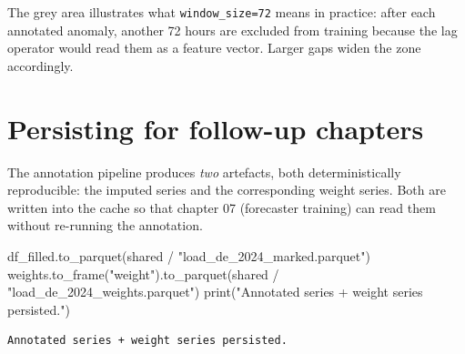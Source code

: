 \documentclass[
  english,
  letterpaper,
]{scrbook}
\newenvironment{Shaded}{\begin{snugshade}}{\end{snugshade}}
\newcommand{\BuiltInTok}[1]{\textcolor[rgb]{0.00,0.23,0.31}{#1}}
\newcommand{\NormalTok}[1]{\textcolor[rgb]{0.00,0.23,0.31}{#1}}
\newcommand{\OperatorTok}[1]{\textcolor[rgb]{0.37,0.37,0.37}{#1}}
\newcommand{\StringTok}[1]{\textcolor[rgb]{0.13,0.47,0.30}{#1}}
\begin{document}
The grey area illustrates what \texttt{window\_size=72} means in
practice: after each annotated anomaly, another 72 hours are excluded
from training because the lag operator would read them as a feature
vector. Larger gaps widen the zone accordingly.

\section{Persisting for follow-up
chapters}\label{persisting-for-follow-up-chapters}

The annotation pipeline produces \emph{two} artefacts, both
deterministically reproducible: the imputed series and the corresponding
weight series. Both are written into the cache so that chapter 07
(forecaster training) can read them without re-running the annotation.

\protect{}\label{persist}
\begin{Shaded}
\begin{Highlighting}[]
\NormalTok{df\_filled.to\_parquet(shared }\OperatorTok{/} \StringTok{"load\_de\_2024\_marked.parquet"}\NormalTok{)}
\NormalTok{weights.to\_frame(}\StringTok{"weight"}\NormalTok{).to\_parquet(shared }\OperatorTok{/} \StringTok{"load\_de\_2024\_weights.parquet"}\NormalTok{)}
\BuiltInTok{print}\NormalTok{(}\StringTok{"Annotated series + weight series persisted."}\NormalTok{)}
\end{Highlighting}
\end{Shaded}

\begin{verbatim}
Annotated series + weight series persisted.
\end{verbatim}
\end{document}
